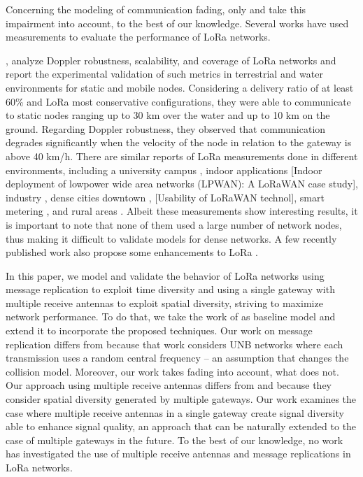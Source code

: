 

Concerning the modeling of communication fading,
	only \citet{georgiou_low_2017} and \citet{pop_does_2017} take this impairment into account,
	to the best of our knowledge.
Several works have used measurements to evaluate the performance of LoRa networks.

\citet{petajajarvi_performance_2017},
	\cite{petajajarvi_evaluation_2017} analyze Doppler robustness,
	scalability,
	and coverage of LoRa networks and report the experimental validation of such metrics in terrestrial and water environments for static and mobile nodes.
Considering a delivery ratio of at least 60\% and
LoRa most conservative configurations,
	they were able to communicate to static nodes ranging up to 30 km over the water and up to 10 km on the ground.
Regarding Doppler robustness,
	they observed that communication degrades significantly when the velocity of the node in relation to the gateway is above 40 km/h.
There are similar reports of LoRa measurements done in different environments,
	including a university campus \cite{wang_performance_2017},
	indoor applications [Indoor deployment of lowpower wide area networks (LPWAN):
	A LoRaWAN case study],
	industry \cite{angrisani_lora_2017},
	dense cities downtown \cite{jorke_urban_2017},
	[Usability of LoRaWAN technol],
	smart metering \cite{rizzi_evaluation_2017},
	and rural areas \cite{oliveira_long_2017}.
Albeit these measurements show interesting results,
	it is important to note that none of them used a large number of network nodes,
	thus making it difficult to validate models for dense networks.
A few recently published work also propose some enhancements to LoRa .


In this paper,
	we model and validate the behavior of LoRa networks using message replication to exploit time diversity and using a single gateway with multiple receive antennas to exploit spatial diversity,
	striving to maximize network performance.
To do that,
	we take the work of \cite{georgiou_low_2017} as baseline model and extend it to incorporate the proposed techniques.
Our work on message replication differs from \cite{mo_optimization_2016} because that work considers UNB networks where each transmission uses a random central frequency – an assumption that changes the collision model.
Moreover,
	our work takes fading into account,
	what \cite{mo_optimization_2016} does not.
Our approach using multiple receive antennas differs from \cite{song_evaluation_2017} and \cite{magrin_performance_2017} because they consider spatial diversity generated by multiple gateways.
Our work examines the case where multiple receive antennas in a single gateway create signal diversity able to enhance signal quality,
	an approach that can be naturally extended to the case of multiple gateways in the future.
To the best of our knowledge,
	no work has investigated the use of multiple receive antennas and message replications in LoRa networks.

